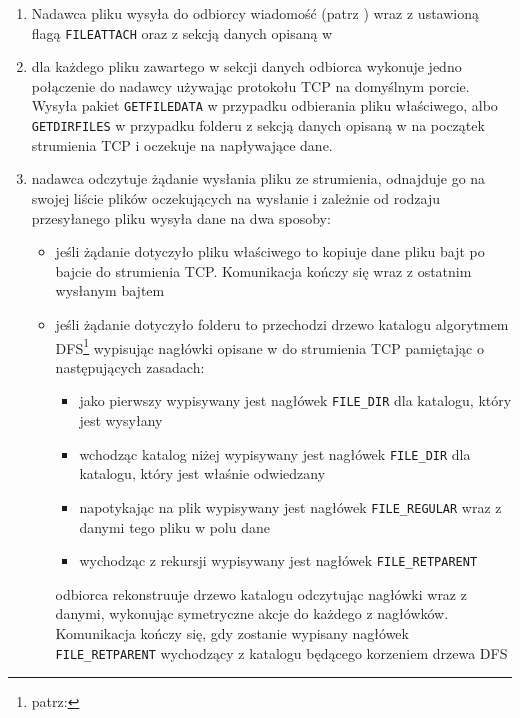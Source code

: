 \documentclass[11pt,leqno]{article}
\begin{document}
\begin{enumerate}
	\item Nadawca pliku wysyła do odbiorcy wiadomość (patrz )
	wraz z ustawioną flagą \texttt{FILEATTACH} oraz z sekcją danych opisaną w 
	\item dla każdego pliku zawartego w sekcji danych odbiorca wykonuje jedno połączenie
	do nadawcy używając protokołu TCP na domyślnym porcie. Wysyła pakiet \texttt{GETFILEDATA}
	w przypadku odbierania pliku właściwego, albo \texttt{GETDIRFILES} w przypadku folderu
	z sekcją danych opisaną w  na początek strumienia TCP i oczekuje na
	napływające dane.
	\item nadawca odczytuje żądanie wysłania pliku ze strumienia, odnajduje go na swojej liście plików oczekujących
	na wysłanie i zależnie od rodzaju przesyłanego pliku wysyła dane na dwa sposoby:
	\begin{itemize}
		\item jeśli żądanie dotyczyło pliku właściwego to kopiuje dane pliku bajt po bajcie do
		strumienia TCP. Komunikacja kończy się wraz z ostatnim wysłanym bajtem
		\item jeśli żądanie dotyczyło folderu to przechodzi drzewo katalogu algorytmem DFS\footnote{patrz: }
		wypisując nagłówki opisane w  do strumienia TCP
		pamiętając o następujących zasadach:
		\begin{itemize}
			\item jako pierwszy wypisywany jest nagłówek \texttt{FILE\_DIR} dla
			katalogu, który jest wysyłany
			\item wchodząc katalog niżej wypisywany jest nagłówek \texttt{FILE\_DIR} dla katalogu,
			który jest właśnie odwiedzany
			\item napotykając na plik wypisywany jest nagłówek \texttt{FILE\_REGULAR}
			wraz z danymi tego pliku w polu dane
			\item wychodząc z rekursji wypisywany jest nagłówek \texttt{FILE\_RETPARENT}
		\end{itemize}
		odbiorca rekonstruuje drzewo katalogu odczytując nagłówki wraz z danymi,
		wykonując symetryczne akcje do każdego z nagłówków. Komunikacja kończy się, gdy
		zostanie wypisany nagłówek \texttt{FILE\_RETPARENT} wychodzący z katalogu
		będącego korzeniem drzewa DFS
	\end{itemize}
\end{enumerate}
\end{document}
